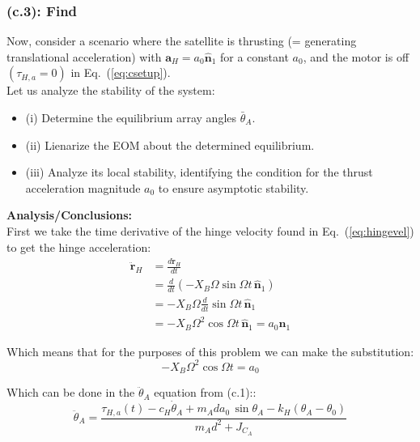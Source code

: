 \documentclass[titlepage]{article}
\begin{document}
\subsubsection*{(c.3): Find}
Now, consider a scenario where the satellite is thrusting (= generating translational acceleration) with $\boldsymbol{a}_H=a_0\hat{\boldsymbol{n}}_1$ for a constant $a_0$, and the motor is off $(\tau_{H,a}=0)$ in Eq.~(\ref{eq:csetup}).\\

Let us analyze the stability of the system:
\begin{itemize}
	\item (i) Determine the equilibrium array angles $\bar{\theta}_A$.
	\item (ii) Lienarize the EOM about the determined equilibrium.
	\item (iii) Analyze its local stability, identifying the condition for the thrust acceleration magnitude $a_0$ to ensure asymptotic stability.
\end{itemize}

\newpage

\textbf{Analysis/Conclusions:}\\
First we take the time derivative of the hinge velocity found in Eq.~(\ref{eq:hingevel}) to get the hinge acceleration:
\begin{equation}
	\begin{split}
		\ddot{\boldsymbol{r}}_H&=\frac{d\dot{\boldsymbol{r}}_H}{dt} \\
		&=\frac{d}{dt}\left(-X_B\Omega\sin\Omega t\,\hat{\boldsymbol{n}}_1\right) \\
		&=-X_B\Omega\frac{d}{dt}\sin\Omega t\,\hat{\boldsymbol{n}}_1 \\
		&=-X_B\Omega^2\cos\Omega t\,\hat{\boldsymbol{n}}_1=a_0\hat{\boldsymbol{n}}_1
	\end{split}
\end{equation}

Which means that for the purposes of this problem we can make the substitution:
\begin{equation}
	-X_B\Omega^2\cos\Omega t=a_0
\end{equation}

Which can be done in the $\ddot{\theta}_A$ equation from (c.1)::
\begin{equation}
	\ddot{\theta}_A=\frac{\tau_{H,a}(t)-c_H\dot{\theta}_A+m_Ada_0\,\sin\theta_A-k_H\left(\theta_A-\theta_0\right)}{m_Ad^2+J_{C_A}}
\end{equation}
\end{document}
